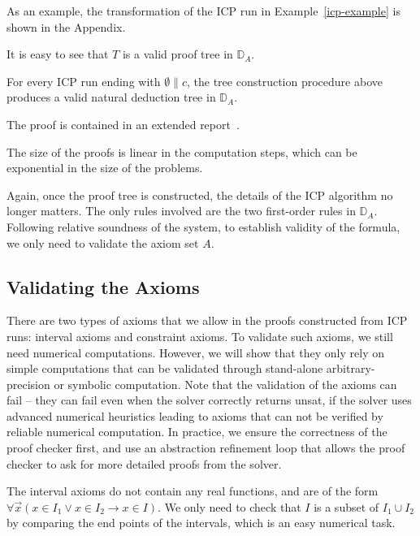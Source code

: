 \documentclass[envcountsect]{llncs}
\begin{document}
As an example, the transformation of the ICP run in Example~\ref{icp-example} is
shown in the Appendix. 

It is easy to see that $T$ is a valid proof tree in $\mathbb{D}_A$.
\begin{proposition}\label{successful_tree}
For every ICP run ending with $\emptyset\parallel c$, the tree construction
procedure above produces a valid natural deduction tree in $\mathbb{D}_A$.
\end{proposition}
 The proof is contained in an extended report~\cite{}. 
\begin{proposition}
 The size of the proofs is linear in the computation steps, which can be
exponential in the size of the problems.
\end{proposition}

Again, once the proof tree is constructed, the details of
the ICP algorithm no longer matters.  The only rules involved are the two
first-order rules in $\mathbb{D}_{A}$. Following relative soundness of the
system, to establish validity of the formula, we only need to validate the
axiom set $A$. 

\subsection{Validating the Axioms}\label{validate}

There are two types of axioms that we allow in the proofs constructed from ICP
runs: interval axioms and constraint axioms. To validate such axioms, we still
need numerical computations. However, we will show that they only rely on
simple computations that can be validated through stand-alone
arbitrary-precision or symbolic computation. Note that the
validation of the axioms can fail -- they can fail even when the solver
correctly returns {\sf unsat}, if the solver uses advanced numerical
heuristics leading to axioms that can not be verified by reliable
numerical computation. In practice, we ensure the correctness of the proof
checker first, and use an abstraction refinement loop that allows the proof
checker to ask for more detailed proofs from the solver.

The interval axioms do not contain any real functions, and are of the form
$\forall \vec x(x\in I_1\vee x\in I_2\rightarrow x\in I)$. We only need to
check that $I$ is a subset of $I_1\cup I_2$ by comparing the end points of the
intervals, which is an easy numerical task. 
\end{document}

